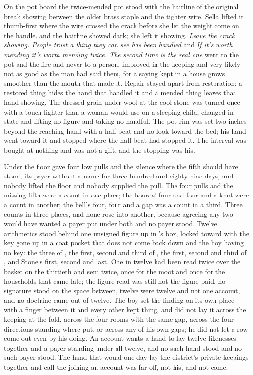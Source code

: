 On the pot board the twice-mended pot stood with the hairline of the original break showing between the older brass staple and the tighter wire. Sella lifted it thumb-first where the wire crossed the crack before she let the weight come on the handle, and the hairline showed dark; she left it showing. \emph{Leave the crack showing. People trust a thing they can see has been handled} and \emph{If it's worth mending it's worth mending twice. The second time is the real one} went to the pot and the fire and never to a person, improved in the keeping and very likely not as good as the man had said them, for a saying kept in a house grows smoother than the mouth that made it. Repair stayed apart from restoration: a restored thing hides the hand that handled it and a mended thing leaves that hand showing. The dressed grain under wool at the cool stone was turned once with a touch lighter than a woman would use on a sleeping child, changed in state and lifting no figure and taking no handful. The pot rim was set two inches beyond the reaching hand with a half-beat and no look toward the bed; his hand went toward it and stopped where the half-beat had stopped it. The interval was bought at nothing and was not a gift, and the stopping was his.

\scenebreak

Under the floor  gave four low pulls and the silence where the fifth should have stood, its payer without a name for three hundred and eighty-nine days, and nobody lifted the floor and nobody supplied the pull. The four pulls and the missing fifth were a count in one place; the boards' four and four and a knot were a count in another; the bell's four, four and a gap was a count in a third. Three counts in three places, and none rose into another, because agreeing any two would have wanted a payer put under both and no payer stood. Twelve arithmetics stood behind one unsigned figure up  in 's box, locked toward  with the key gone up in a coat pocket that does not come back down and the boy having no key: the three of , the first, second and third of , the first, second and third of , and Stone's first, second and last. One in twelve had been read twice over the basket on the thirtieth and sent twice, once for the moot and once for the households that came late; the figure read was still not the figure paid, no signature stood on the space between, twelve were twelve and not one account, and no doctrine came out of twelve. The boy set the finding on its own place with a finger between it and every other kept thing, and did not lay it across the keeping at the fold, across the four rooms with the same gap, across the four directions standing where put, or across any of his own gaps; he did not let a row come out even by his doing. An account wants a hand to lay twelve likenesses together and a payer standing under all twelve, and no such hand stood and no such payer stood. The hand that would one day lay the district's private keepings together and call the joining an account was far off, not his, and not come.

